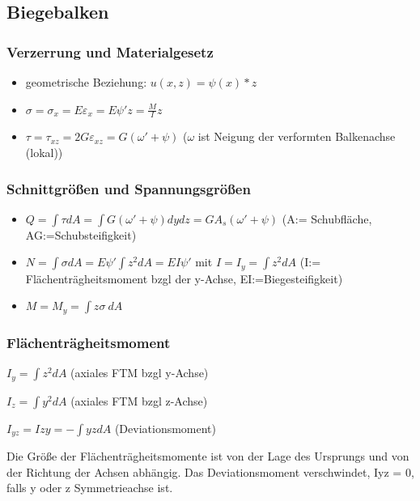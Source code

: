 \documentclass[11pt]{article}
\begin{document}
\subsection{Biegebalken}
\label{sec:org69e97da}
\subsubsection{Verzerrung und Materialgesetz}
\label{sec:org7b47fe3}
\begin{itemize}
\item geometrische Beziehung: \(u(x,z) = \psi (x) * z\)
\item \(\sigma = \sigma_x = E \varepsilon_x = E\psi'z = \frac{M}{I}z\)
\item \(\tau = \tau_{xz} = 2G\varepsilon_{xz} = G(\omega'+\psi)\) (\(\omega\) ist Neigung der verformten Balkenachse (lokal))
\end{itemize}
\subsubsection{Schnittgrößen und Spannungsgrößen}
\label{sec:orgd30fd69}
\begin{itemize}
\item \(Q = \int \tau dA = \int G(\omega' + \psi) dy dz = GA_s (\omega' + \psi)\) (A:= Schubfläche, AG:=Schubsteifigkeit)
\item \(N = \int \sigma dA = E\psi' \int z^2 dA = EI\psi'\) mit \(I = I_y = \int z^2 dA\) (I:= Flächenträgheitsmoment bzgl der y-Achse, EI:=Biegesteifigkeit)
\item \(M = M_y = \int z\sigma \ dA\)
\end{itemize}

\subsubsection{Flächenträgheitsmoment}
\label{sec:org956b63d}
\(I_y = \int z^2 dA\) (axiales FTM bzgl y-Achse)

\(I_z = \int y^2 dA\) (axiales FTM bzgl z-Achse)

\(I_{yz} = I{zy} = -\int yz dA\) (Deviationsmoment)

Die Größe der Flächenträgheitsmomente ist von der Lage des Ursprungs und von der Richtung der Achsen abhängig.
Das Deviationsmoment verschwindet, Iyz = 0, falls y oder z Symmetrieachse ist.
\end{document}
